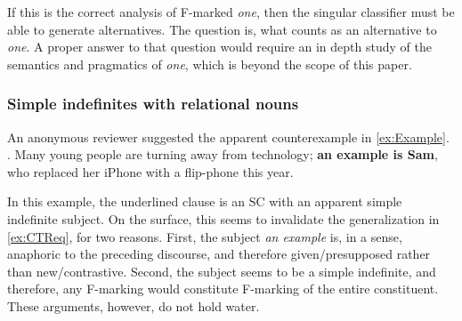 \documentclass[
	letterpaper,
]{article}
\begin{document}
If this is the correct analysis of F-marked \textit{one}, then the singular classifier must be able to generate alternatives.
The question is, what counts as an alternative to \textit{one}.
A proper answer to that question would require an in depth study of the semantics and pragmatics of \textit{one}, which is beyond the scope of this paper.
%
%

\subsubsection{Simple indefinites with relational nouns}
An anonymous reviewer suggested the apparent counterexample in \ref{ex:Example}.
\ex. \label{ex:Example} Many young people are turning away from technology; \textbf{an example is Sam}, who replaced her iPhone with a flip-phone this year.

In this example, the underlined clause is an SC with an apparent simple indefinite subject.
On the surface, this seems to invalidate the generalization in \ref{ex:CTReq}, for two reasons.
First, the subject \textit{an example} is, in a sense, anaphoric to the preceding discourse, and therefore given/presupposed rather than new/contrastive.
Second, the subject seems to be a simple indefinite, and therefore, any F-marking would constitute F-marking of the entire constituent.
These arguments, however, do not hold water.
\end{document}
